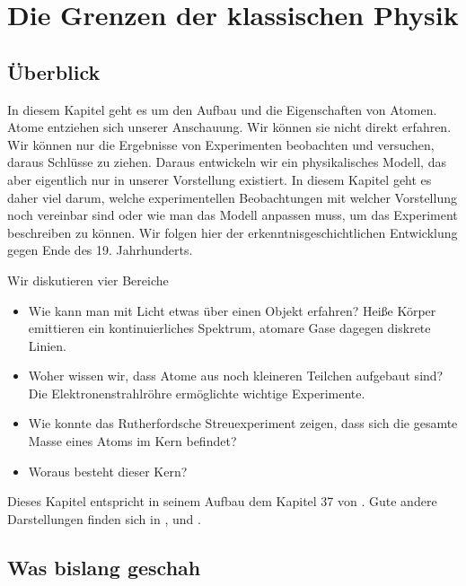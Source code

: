 \renewcommand{\lastmod}{9. Oktober 2024}
\renewcommand{\chapterauthors}{Markus Lippitz}

\chapter{Die Grenzen der klassischen Physik}


\section{Überblick}

In diesem Kapitel geht es um den Aufbau und die Eigenschaften von Atomen. Atome entziehen sich unserer Anschauung. Wir können sie nicht direkt erfahren. Wir können nur die Ergebnisse von Experimenten beobachten und versuchen, daraus Schlüsse zu ziehen. Daraus entwickeln wir ein physikalisches Modell, das aber eigentlich nur in unserer Vorstellung existiert. In diesem Kapitel geht es daher viel darum, welche experimentellen Beobachtungen mit welcher Vorstellung noch vereinbar sind oder wie man das Modell anpassen muss, um das Experiment beschreiben zu können. Wir folgen hier der erkenntnisgeschichtlichen Entwicklung gegen Ende des 19. Jahrhunderts.

\vspace*{\parskip}

Wir diskutieren vier Bereiche
\begin{itemize} \setlength{\itemsep}{0pt}
    \item Wie kann man mit Licht etwas über einen Objekt erfahren? Heiße Körper emittieren ein kontinuierliches Spektrum, atomare Gase dagegen diskrete Linien.
    \item Woher wissen wir, dass Atome aus noch kleineren Teilchen aufgebaut sind? Die Elektronenstrahlröhre ermöglichte wichtige Experimente.
    \item Wie konnte das Rutherfordsche Streuexperiment zeigen, dass sich die gesamte Masse eines Atoms im Kern befindet?
    \item Woraus besteht dieser Kern?
\end{itemize}


Dieses Kapitel entspricht in seinem Aufbau dem Kapitel 37 von \cite{Knight_physics}. Gute andere Darstellungen finden sich in \cite{Haliday_Resnick}, \cite{Demtröder_ep3} und \cite{Haken_wolf_I}.





\section{Was bislang geschah}

